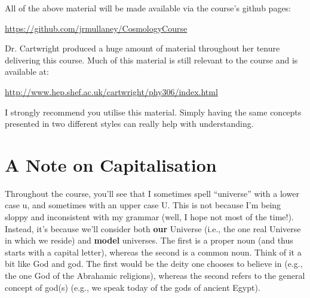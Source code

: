 \documentclass[11pt]{article}
\begin{document}
    \noindent
    All of the above material will be made available via the course's github pages:

    \noindent
    \url{https://github.com/jrmullaney/CosmologyCourse}
    
    Dr. Cartwright produced a huge amount of material throughout her tenure delivering this course. Much of this material is still relevant to the course and is available at:
    
    \noindent
    \url{http://www.hep.shef.ac.uk/cartwright/phy306/index.html}
    
    \noindent
    I strongly recommend you utilise this material. Simply having the same concepts presented in two different styles can really help with understanding.
    
    \section{A Note on Capitalisation}
   Throughout the course, you'll see that I sometimes spell ``universe'' with a lower case u, and sometimes with an upper case U. This is not because I'm being sloppy and inconsistent with my grammar (well, I hope not most of the time!). Instead, it's because we'll consider both {\bf our} Universe (i.e., the one real Universe in which we reside) and {\bf model} universes. The first is a proper noun (and thus starts with a capital letter), whereas the second is a common noun. Think of it a bit like God and god. The first would be the deity one chooses to believe in (e.g., the one God of the Abrahamic religions), whereas the second refers to the general concept of god(s) (e.g., we speak today of the gods of ancient Egypt).
    
    
\end{document}
